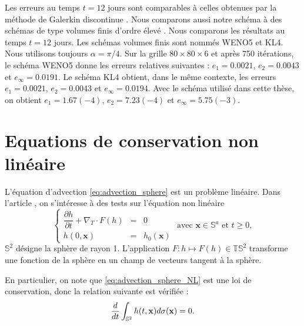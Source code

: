 Les erreurs au temps $t=12$ jours sont comparables à celles obtenues par la méthode de Galerkin discontinue \cite{Nair2008}. Nous comparons aussi notre schéma à des schémas de type volumes finis d'ordre élevé \cite{Katta2015}. Nous comparons les résultats au temps $t=12$ jours. Les schémas volumes finis sont nommés WENO5 et KL4. Nous utilisons toujours $\alpha = \pi/4$. Sur la grille $80 \times 80 \times 6$ et après 750 itérations, le schéma WENO5 donne les erreurs relatives suivantes : $e_1 = 0.0021$, $e_2 = 0.0043$ et $e_{\infty} = 0.0191$. Le schéma KL4 obtient, dans le même contexte, les erreurs $e_1 = 0.0021$, $e_2 = 0.0043$ et $e_{\infty} = 0.0194$. Avec le schéma utilisé dans cette thèse, on obtient $e_1 = 1.67(-4)$, $e_2=7.23(-4)$ et $e_{\infty} = 5.75(-3)$.


























\section{Equations de conservation non linéaire}

L'équation d'advection \eqref{eq:advection_sphere} est un problème linéaire. Dans l'article \cite{BenArtzi2009}, on s'intéresse à des tests sur l'équation non linéaire
\begin{equation}
\left\lbrace
\begin{array}{rcl}
\dfrac{\partial h}{\partial t} + \nabla_T \cdot F(h) & = & 0 \\
h(0,\mathbf{x}) & = & h_0(\mathbf{x})
\end{array}
\right. \text{ avec } \mathbf{x} \in \mathbb{S}^a \text{ et } t \geq 0,
\label{eq:advection_sphere_NL}
\end{equation}
$\mathbb{S}^2$ désigne la sphère de rayon 1. L'application $F : h \mapsto F(h) \in \mathbb{T}\mathbb{S}^2$ transforme une fonction de la sphère en un champ de vecteurs tangent à la sphère.

En particulier, on note que \eqref{eq:advection_sphere_NL} est une loi de conservation, donc la relation suivante est vérifiée :
\begin{equation}
\dfrac{d}{dt} \displaystyle\int_{\mathbb{S}^2} h(t,\mathbf{x}) d \sigma(\mathbf{x}) = 0.
\end{equation}

